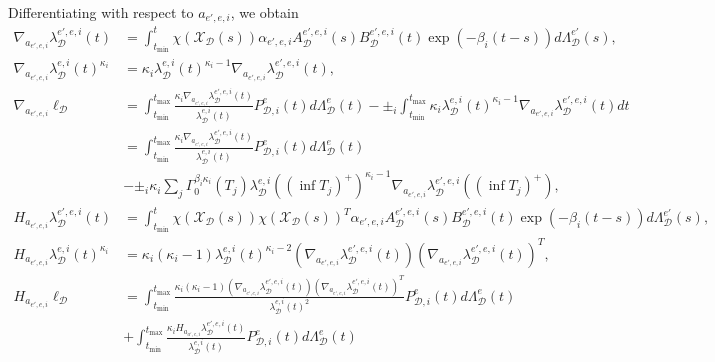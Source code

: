 \documentclass[honours,12pt]{unswthesis}
\numberwithin{equation}{section}
\begin{document}
Differentiating with respect to $a_{e',e,i}$, we obtain
\begin{equation*}
	\begin{align}
		\nabla_{a_{e',e,i}} \lambda_\mathcal{D}^{e',e,i}(t) &= \int_{t_\mathrm{min}}^t \chi(\mathcal{X}_\mathcal{D}(s)) \alpha_{e',e,i}A_\mathcal{D}^{e',e,i}(s)B_\mathcal{D}^{e',e,i}(t) \exp(-\beta_i(t-s)) d\Lambda_\mathcal{D}^{e'}(s),\\
		\nabla_{a_{e',e,i}} \lambda_\mathcal{D}^{e,i}(t)^{\kappa_i} &= \kappa_i \lambda_\mathcal{D}^{e,i}(t)^{\kappa_i-1} \nabla_{a_{e',e,i}} \lambda_\mathcal{D}^{e',e,i}(t), \\
		\nabla_{a_{e',e,i}} \ell_\mathcal{D} &= \int_{t_\mathrm{min}}^{t_\mathrm{max}} \frac{\kappa_i \nabla_{a_{e',e,i}}\lambda_\mathcal{D}^{e',e,i}(t) }{\lambda_\mathcal{D}^{e,i}(t)} P_{\mathcal{D},i}^e(t) d\Lambda_\mathcal{D}^e(t) - \pm_i\int_{t_\mathrm{min}}^{t_\mathrm{max}} \kappa_i \lambda_\mathcal{D}^{e,i}(t)^{\kappa_i-1} \nabla_{a_{e',e,i}} \lambda_\mathcal{D}^{e',e,i}(t) dt \\
		&= \int_{t_\mathrm{min}}^{t_\mathrm{max}} \frac{\kappa_i \nabla_{a_{e',e,i}}\lambda_\mathcal{D}^{e',e,i}(t) }{\lambda_\mathcal{D}^{e,i}(t)} P_{\mathcal{D},i}^e(t) d\Lambda_\mathcal{D}^e(t) \\
		&- \pm_i\kappa_i \sum_j \Gamma_0^{\beta_i\kappa_i}(T_j)\lambda_\mathcal{D}^{e,i}((\inf T_j)^+)^{\kappa_i-1} \nabla_{a_{e',e,i}} \lambda_\mathcal{D}^{e',e,i}((\inf T_j)^+), \\
		H_{a_{e',e,i}} \lambda_\mathcal{D}^{e',e,i}(t) &= \int_{t_\mathrm{min}}^t \chi(\mathcal{X}_\mathcal{D}(s)) \chi(\mathcal{X}_\mathcal{D}(s))^T \alpha_{e',e,i}A_\mathcal{D}^{e',e,i}(s)B_\mathcal{D}^{e',e,i}(t) \exp(-\beta_i(t-s)) d\Lambda_\mathcal{D}^{e'}(s), \\
		H_{a_{e',e,i}} \lambda_\mathcal{D}^{e,i}(t)^{\kappa_i} &= \kappa_i(\kappa_i-1) \lambda_\mathcal{D}^{e,i}(t)^{\kappa_i-2} \left(\nabla_{a_{e',e,i}}\lambda_\mathcal{D}^{e',e,i}(t)\right) \left(\nabla_{a_{e',e,i}}\lambda_\mathcal{D}^{e',e,i}(t)\right)^T, \\
		H_{a_{e',e,i}} \ell_\mathcal{D} &= \int_{t_\mathrm{min}}^{t_\mathrm{max}} \frac{\kappa_i(\kappa_i-1) (\nabla_{a_{e',e,i}}\lambda_\mathcal{D}^{e',e,i}(t)) (\nabla_{a_{e',e,i}}\lambda_\mathcal{D}^{e',e,i}(t))^T }{\lambda_\mathcal{D}^{e,i}(t)^2} P_{\mathcal{D},i}^e(t) d\Lambda_\mathcal{D}^e(t) \\
		&+ \int_{t_\mathrm{min}}^{t_\mathrm{max}} \frac{\kappa_i H_{a_{a',e,i}}\lambda_\mathcal{D}^{e',e,i}(t)}{\lambda_\mathcal{D}^{e,i}(t)} P_{\mathcal{D},i}^e(t) d\Lambda_\mathcal{D}^e(t) \\

\end{align}
\end{equation*}
\end{document}
